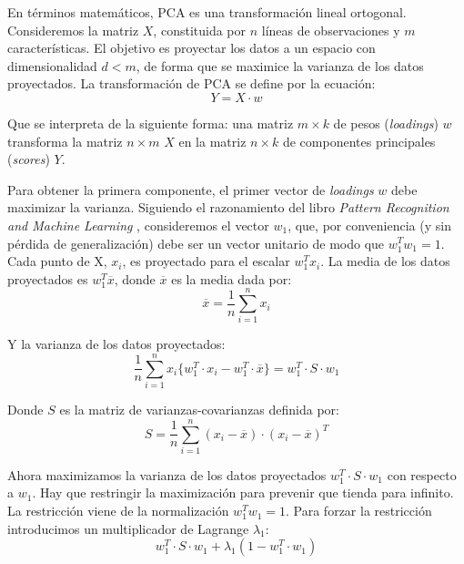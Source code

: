\documentclass[11pt,spanish,listoffigures,listoftables]{tfgetsinf}
\begin{document}
   En términos matemáticos, PCA es una transformación lineal ortogonal. Consideremos la matriz \(X\), constituida por \(n\) líneas de observaciones y \(m\) características. El objetivo es proyectar los datos a un espacio con dimensionalidad \(d < m\), de forma que se maximice la varianza de los datos proyectados. La transformación de PCA se define por la ecuación:
   \begin{equation}
   Y = X \cdot w
   \end{equation}
   
   Que se interpreta de la siguiente forma: una matriz \(m \times k\) de pesos ({\em loadings}) \(w\) transforma la matriz \(n \times m\) \(X\) en la matriz \(n \times k\) de componentes principales ({\em scores}) \(Y\).

   Para obtener la primera componente, el primer vector de {\em loadings} \(w\) debe maximizar la varianza. Siguiendo el razonamiento del libro \textit{Pattern Recognition and Machine Learning} \cite{bishop}, consideremos el vector \(w_{1}\), que, por conveniencia (y sin pérdida de generalización) debe ser un vector unitario de modo que \(w_{1}^{T}w_{1}=1\). Cada punto de X, \(x_{i}\), es proyectado para el escalar \(w_{1}^{T}x_{i}\). La media de los datos proyectados es \(w_{1}^{T} \overline{x}\), donde \(\overline{x}\) es la media dada por:
   \begin{equation}
   \overline{x} = \frac{1}{n}\sum_{i=1}^{n}x_{i}
   \end{equation}
   
   Y la varianza de los datos proyectados:
   \begin{equation}
   \frac{1}{n}\sum_{i=1}^{n}x_{i}\big\{w_{1}^{T}\cdot x_{i}-w_{1}^{T}\cdot \overline{x}\big\} = w_{1}^{T}\cdot S\cdot w_{1}
   \end{equation}
   
   Donde \(S\) es la matriz de varianzas-covarianzas definida por:
   \begin{equation}
   S=\frac{1}{n}\sum_{i=1}^{n}(x_{i}-\overline{x})\cdot (x_{i}-\overline{x})^{T}
   \end{equation}
   
   Ahora maximizamos la varianza de los datos proyectados \(w_{1}^{T}\cdot S\cdot w_{1}\) con respecto a \(w_{1}\). Hay que restringir la maximización para prevenir que tienda para infinito. La restricción viene de la normalización \(w_{1}^{T}w_{1}=1\). Para forzar la restricción introducimos un multiplicador de Lagrange \(\lambda_{1}\):
   \begin{equation}
   w_{1}^{T}\cdot S\cdot w_{1} + \lambda_{1} (1 - w_{1}^{T}\cdot w_{1})
   \end{equation}
   
\end{document}
